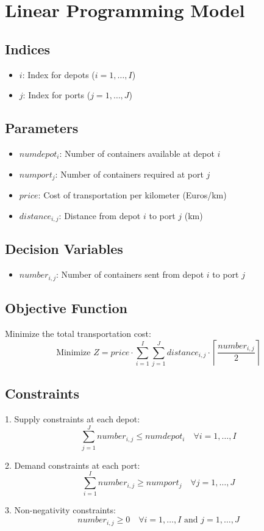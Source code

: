 \documentclass{article}
\begin{document}
\section*{Linear Programming Model}

\subsection*{Indices}
\begin{itemize}
    \item $i$: Index for depots ($i = 1, \ldots, I$)
    \item $j$: Index for ports ($j = 1, \ldots, J$)
\end{itemize}

\subsection*{Parameters}
\begin{itemize}
    \item $numdepot_i$: Number of containers available at depot $i$
    \item $numport_j$: Number of containers required at port $j$
    \item $price$: Cost of transportation per kilometer (Euros/km)
    \item $distance_{i,j}$: Distance from depot $i$ to port $j$ (km)
\end{itemize}

\subsection*{Decision Variables}
\begin{itemize}
    \item $number_{i,j}$: Number of containers sent from depot $i$ to port $j$
\end{itemize}

\subsection*{Objective Function}
Minimize the total transportation cost:
\[
\text{Minimize } Z = price \cdot \sum_{i=1}^{I} \sum_{j=1}^{J} distance_{i,j} \cdot \left\lceil \frac{number_{i,j}}{2} \right\rceil
\]

\subsection*{Constraints}
1. Supply constraints at each depot:
\[
\sum_{j=1}^{J} number_{i,j} \leq numdepot_i \quad \forall i = 1, \ldots, I
\]

2. Demand constraints at each port:
\[
\sum_{i=1}^{I} number_{i,j} \geq numport_j \quad \forall j = 1, \ldots, J
\]

3. Non-negativity constraints:
\[
number_{i,j} \geq 0 \quad \forall i = 1, \ldots, I \text{ and } j = 1, \ldots, J
\]
\end{document}
